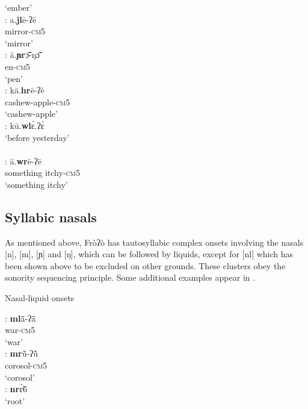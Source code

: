 \documentclass[output=paper]{langscibook}
\begin{document}
\begin{exe}
\begin{multicols}{2}
\begin{xlisti}
            {} `ember' \\
        \ex \glll [jl]:      a.\textbf{jl}ē-ʔē \\
            {}   mirror-\textsc{cm}5  \\
            {} `mirror'\\
        \ex \glll [ɲr]:   ā.\textbf{ɲr}ɔ̃̄-ŋɔ̃̄ \\
            {}  en-\textsc{cm}5 \\
            {} `pen'\\
        \ex \glll  [hr]:    kā.\textbf{hr}ē-ʔè\\
            {}  cashew-apple-\textsc{cm}5\\
            {}  `cashew-apple'\\
        \ex \glll [wl]:  kū.\textbf{wl}ɛ̀.ʔɛ̀ \\
            {} {`before yesterday'}\\
            {} {}\\
        \ex \glll  [wr]:    ā.\textbf{wr}ē-ʔē\\
            {} {something itchy-\textsc{cm}5}\\
            {} {`something itchy'}\\
     \end{xlisti}
     \end{multicols}
 \end{exe}

\subsection{ Syllabic nasals}
\label{sec:traore:syllabicnasals:2d}

As mentioned above, Fròʔò has tautosyllabic complex onsets involving the nasals [n], [m], [ɲ] and [ŋ], which can be followed by liquids, except for [nl] which has been shown above to be excluded on other grounds. These clusters obey the sonority sequencing principle. Some additional examples appear in .

 \begin{exe}
    \ex Nasal-liquid onsets \label{ex:traore:nasalWithLiquids:16}\\
     \begin{multicols}{3}
        \begin{xlist}
            \ex \glll [ml]:       \textbf{ml}ã̄-ʔã̄ \\
                {}  war-\textsc{cm}5 \\
                {} `war'\\
            \ex \glll [mr]:       \textbf{mr}ũ̀-ʔũ̀ \\
                {}   corosol-\textsc{cm}5\\
                {}  `corosol'\\
            \ex \gll [nr]:      \textbf{nr}ɛ̃̀6 \\
                {}  `root'\\
        \end{xlist}
     \end{multicols}
 \end{exe}
\end{document}
